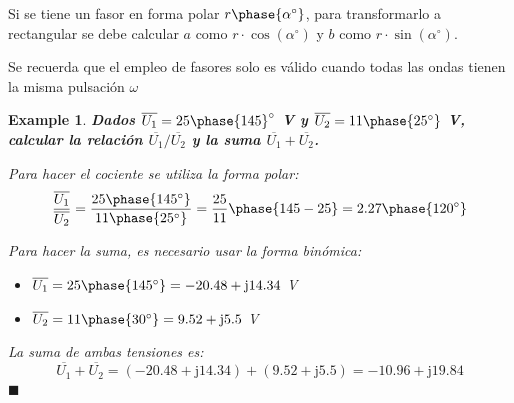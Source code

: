 \documentclass[11pt]{book} %
\numberwithin{dummy}{section}
\theoremstyle{ocrenumbox}
\theoremstyle{blacknumex}
\newtheorem{exampleT}{Example}[chapter]
\theoremstyle{blacknumbox}
\theoremstyle{ocrenum}
\newenvironment{example}{\begin{exampleT}}{\hfill{\tiny\ensuremath{\blacksquare}}\end{exampleT}}
\newenvironment{remark}{\par\vspace{10pt}\small %
\begin{list}{}{
\leftmargin=35pt %
\rightmargin=25pt}\item\ignorespaces %
\makebox[-2.5pt]{\begin{tikzpicture}[overlay]
\node[draw=ocre!60,line width=1pt,circle,fill=ocre!25,font=\sffamily\bfseries,inner sep=2pt,outer sep=0pt] at (-15pt,0pt){\textcolor{ocre}{N}};\end{tikzpicture}} %
\advance\baselineskip -1pt}{\end{list}\vskip5pt} %
\newlength\esp
\begin{document}
	\begin{remark}
		Si se tiene un fasor en forma polar $r\phase{\alpha^\circ}$, para transformarlo a rectangular se debe calcular $a$ como $r\cdot \cos(\alpha^\circ)$ y $b$ como $r\cdot \sin(\alpha^\circ)$.
	\end{remark}
	
	\begin{remark}
		Se recuerda que el empleo de fasores solo es válido cuando todas las ondas tienen la misma pulsación $\omega$
	\end{remark}
	
	\vspace{4mm}
	\begin{example}
		\textbf{Dados $\overline{U_1}=25\phase{145}^\circ$ V y $\overline{U_2}=11\phase{25^\circ}$ V, calcular la relación $\overline{U_1}/\overline{U_2}$ y la suma $\overline{U_1}+\overline{U_2}$.}
		
		Para hacer el cociente se utiliza la forma polar: 
		\begin{equation*}
			\dfrac{\overline{U_1}}{\overline{U_2}}=\dfrac{25\phase{145^\circ}}{11\phase{25^\circ}}=\dfrac{25}{11}\phase{145-25}=2.27\phase{120^\circ}
		\end{equation*}
		
		Para hacer la suma, es necesario usar la forma binómica:
		\begin{itemize}
			\item $\overline{U_1}=25\phase{145^\circ}=-20.48+\mathrm{j} 14.34$ V
			\item $\overline{U_2}=11\phase{30^\circ}=9.52+\mathrm{j} 5.5$ V
		\end{itemize}
		
		La suma de ambas tensiones es: 
		\begin{equation*}
			\overline{U_1}+\overline{U_2}=(-20.48+\mathrm{j}14.34)+(9.52+\mathrm{j}5.5)=-10.96+\mathrm{j}19.84
		\end{equation*}
	\end{example}
	
\end{document}
